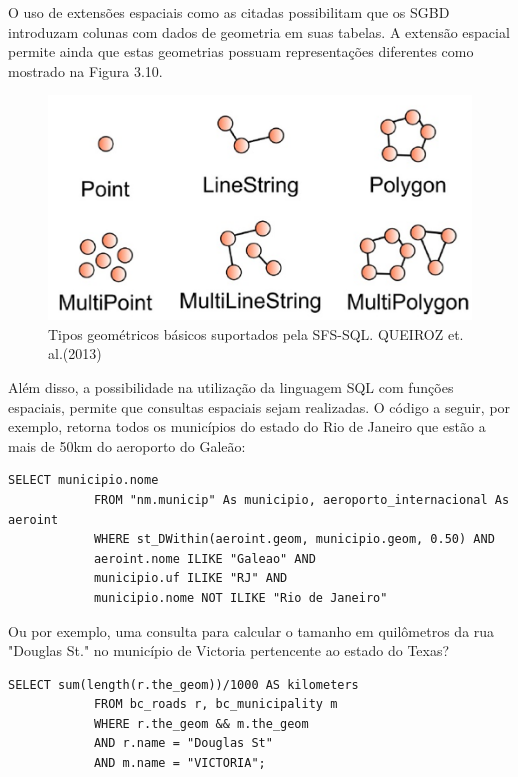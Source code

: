 		O uso de extensões espaciais como as citadas possibilitam que os SGBD introduzam colunas com dados de geometria em suas tabelas. A extensão espacial permite ainda que estas geometrias possuam representações diferentes como mostrado na Figura 3.10. 
		
		\begin{figure}
			\centering
			\includegraphics[width=1\linewidth]{data/sfs-sql}
			\caption{Tipos geométricos básicos suportados pela SFS-SQL. QUEIROZ et. al.(2013)}
			\label{fig:sfs-sql}
		\end{figure}
		
		Além disso, a possibilidade na utilização da linguagem SQL com funções espaciais, permite que consultas espaciais sejam realizadas. O código a seguir, por exemplo, retorna todos os municípios do estado do Rio de Janeiro que estão a mais de 50km do aeroporto do Galeão:
		
		\begin{lstlisting}[float,floatplacement=H]
			SELECT municipio.nome
			FROM "nm.municip" As municipio, aeroporto_internacional As aeroint 
			WHERE st_DWithin(aeroint.geom, municipio.geom, 0.50) AND 
			aeroint.nome ILIKE "Galeao" AND
			municipio.uf ILIKE "RJ" AND
			municipio.nome NOT ILIKE "Rio de Janeiro"
		\end{lstlisting}
		
		Ou por exemplo, uma consulta para calcular o tamanho em quilômetros da rua "Douglas St." no município de Victoria pertencente ao estado do Texas?
		
		\begin{lstlisting}[float,floatplacement=H]
			SELECT sum(length(r.the_geom))/1000 AS kilometers
			FROM bc_roads r, bc_municipality m
			WHERE r.the_geom && m.the_geom
			AND r.name = "Douglas St"
			AND m.name = "VICTORIA";
		\end{lstlisting}
		
